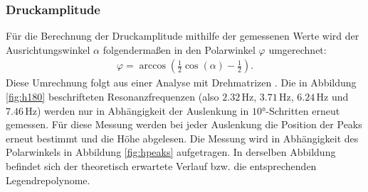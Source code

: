 \subsubsection{Druckamplitude}
Für die Berechnung der Druckamplitude mithilfe der gemessenen Werte wird der Ausrichtungswinkel $\alpha$ folgendermaßen in den Polarwinkel $\varphi$ umgerechnet:
\begin{align*}
  \varphi = \arccos(\frac{1}{2} \cos(\alpha) - \frac{1}{2}).
\end{align*}
Diese Umrechnung folgt aus einer Analyse mit Drehmatrizen \cite{qa-dresden}. Die in Abbildung \ref{fig:h180} beschrifteten Resonanzfrequenzen (also $2.32 \,\si{\hertz}$, $3.71 \,\si{\hertz}$, $6.24 \,\si{\hertz}$ und $7.46 \,\si{\hertz}$) werden nur in Abhängigkeit der Auslenkung in $10°$-Schritten erneut gemessen. Für diese Messung werden bei jeder Auslenkung die Position der Peaks erneut bestimmt und die Höhe abgelesen. 
Die Messung wird in Abhängigkeit des Polarwinkels in Abbildung \ref{fig:hpeaks} aufgetragen. In derselben Abbildung befindet sich der theoretisch erwartete Verlauf bzw. die entsprechenden Legendrepolynome. 
